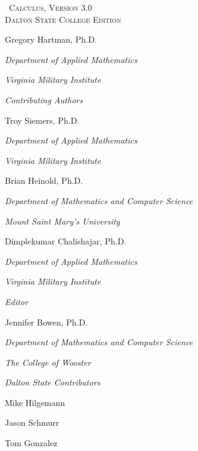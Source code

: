 
\hskip 125pt\begin{minipage}{\textwidth}
\begin{flushright}

\textsc{\large \apex\ {\Huge Calculus}, {\small Version 3.0}} \\

\textsc{Dalton State College Edition}\\
{
\Large
\vspace{0.25in}

Gregory Hartman, Ph.D.

\emph{\small Department of Applied Mathematics}

\emph{\small Virginia Military Institute}\vskip15pt

\parbox{200pt}{\textit{Contributing Authors}}\hskip 2cm \phantom{.}

Troy Siemers, Ph.D.

\emph{\small Department of Applied Mathematics}

\emph{\small Virginia Military Institute}\vskip 15pt

Brian Heinold, Ph.D.

\emph{\small Department of Mathematics and Computer Science}

\emph{\small Mount Saint Mary's University}\vskip 15pt

Dimplekumar Chalishajar, Ph.D.

\emph{\small Department of Applied Mathematics}

\emph{\small Virginia Military Institute}\vskip 15pt

\parbox{200pt}{\textit{Editor}}\hskip 2cm \phantom{.}

Jennifer Bowen, Ph.D.

\emph{\small Department of Mathematics and Computer Science}

\emph{\small The College of Wooster} \vskip 15pt

\parbox{200pt}{\textit{Dalton State Contributors}}\hskip 2cm \phantom{.}

\normalsize

Mike Hilgemann \vskip 5pt

Jason Schmurr \vskip 5pt

Tom Gonzalez}
\normalsize
\end{flushright}
\end{minipage}

